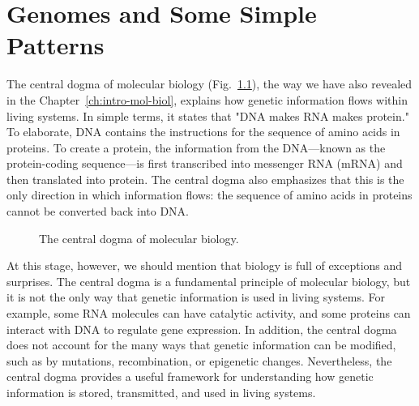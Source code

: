 \chapter{Genomes and Some Simple Patterns}
\label{ch:genome}

The central dogma of molecular biology (Fig.~\ref{fig:g-central-dogma-genome}), the way we have also revealed in the Chapter~\ref{ch:intro-mol-biol}, explains how genetic information flows within living systems. In simple terms, it states that "DNA makes RNA makes protein." To elaborate, DNA contains the instructions for the sequence of amino acids in proteins. To create a protein, the information from the DNA—known as the protein-coding sequence—is first transcribed into messenger RNA (mRNA) and then translated into protein. The central dogma also emphasizes that this is the only direction in which information flows: the sequence of amino acids in proteins cannot be converted back into DNA.

\begin{figure}
  \caption[6pt]{The central dogma of molecular biology.}
  \label{fig:g-central-dogma-genome}
\end{figure}

At this stage, however, we should mention that biology is full of exceptions and surprises. The central dogma is a fundamental principle of molecular biology, but it is not the only way that genetic information is used in living systems. For example, some RNA molecules can have catalytic activity, and some proteins can interact with DNA to regulate gene expression. In addition, the central dogma does not account for the many ways that genetic information can be modified, such as by mutations, recombination, or epigenetic changes. Nevertheless, the central dogma provides a useful framework for understanding how genetic information is stored, transmitted, and used in living systems.

